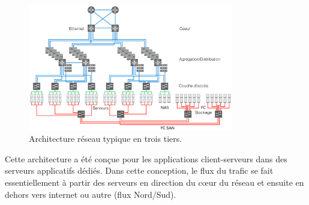 \begin{figure}[h]
\begin{center}
\includegraphics[width=0.8\textwidth]{images/LegacyNetworkArchitecture} 
\caption{Architecture réseau typique en trois tiers. \cite{cloudReadyNetworkJuniper}} \label{legacy_archi}
\end{center}
\end{figure}






Cette architecture a été conçue pour les applications client-serveurs dans des serveurs applicatifs dédiés. Dans cette conception, le flux du trafic se fait essentiellement à partir des serveurs en direction du cœur du réseau et ensuite en dehors vers internet ou autre (flux Nord/Sud).

